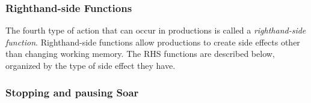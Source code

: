 \subsubsection{Righthand-side Functions}

The fourth type of action that can occur in productions is called a 
\emph{righthand-side function}.  Righthand-side functions allow productions
to create side effects other than changing working memory.  The RHS functions
are described below, organized by the type of side effect they have.

\subsubsection{Stopping and pausing Soar}
\label{RHS-stopping}

